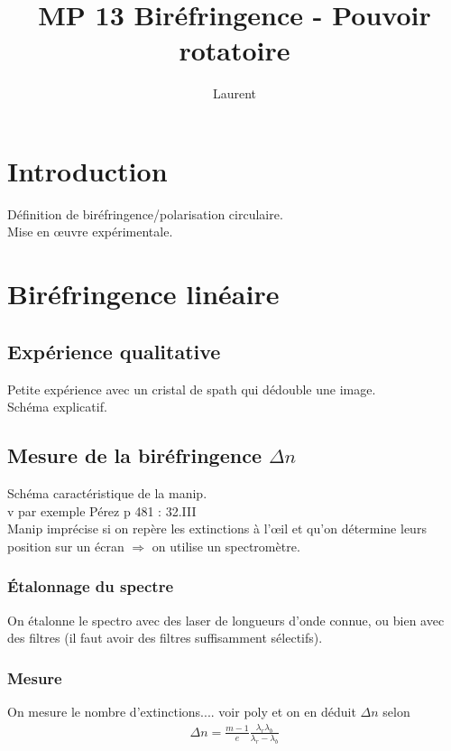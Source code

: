 \documentclass[12pt,prb,aps,epsf]{report}
\begin{document}
	
	\title{MP 13 Biréfringence - Pouvoir rotatoire}
	\author{Laurent}
	
	\maketitle
	
	\tableofcontents
	
	\pagebreak

\section{Introduction}
Définition de biréfringence/polarisation circulaire.\\
Mise en œuvre expérimentale.
	
\section{Biréfringence linéaire}
\subsection{Expérience qualitative}
Petite expérience avec un cristal de spath qui dédouble une image.\\
Schéma explicatif.

\subsection{Mesure de la biréfringence $\Delta n$}
Schéma caractéristique de la manip.\\
v par exemple Pérez p 481 : 32.III\\
Manip imprécise si on repère les extinctions à l'œil et qu'on détermine leurs position sur un écran $\Rightarrow$ on utilise un spectromètre.
\subsubsection{Étalonnage du spectre}
On étalonne le spectro avec des laser de longueurs d'onde connue, ou bien avec des filtres (il faut avoir des filtres suffisamment sélectifs).
\subsubsection{Mesure}
On mesure le nombre d'extinctions.... voir poly et on en déduit $\Delta n$ selon
\begin{eqnarray}
\Delta n = \frac{m-1}{e}\frac{\lambda_r \lambda_b}{\lambda_r-\lambda_b}
\end{eqnarray}
\end{document}
